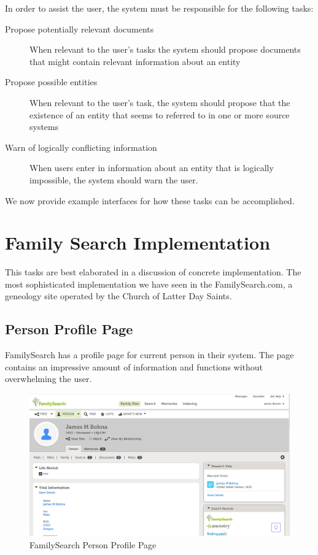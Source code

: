 \documentclass[format=siggraph, review=true]{acmart}
\begin{document}
In order to assist the user, the system must be responsible for the
following tasks:

\begin{description}
\item[Propose potentially relevant documents] When relevant to the
  user's tasks the system should propose documents that might
  contain relevant information about an entity
\item[Propose possible entities] When relevant to the user's task, the
  system should propose that the existence of an entity that seems to
  referred to in one or more source systems
\item[Warn of logically conflicting information] When users enter in
  information about an entity that is logically impossible, the system
  should warn the user.
\end{description}

We now provide example interfaces for how these tasks can be
accomplished.

\section*{Family Search Implementation}
This tasks are best elaborated in a discussion of concrete
implementation. The most sophisticated implementation we have seen in
the FamilySearch.com, a geneology site operated by the Church of
Latter Day Saints. 

\subsection*{Person Profile Page}
FamilySearch has a profile page for current person in their
system. The page contains an impressive amount of information and
functions without overwhelming the user.

\begin{figure}[h]

\includegraphics[width=\columnwidth]{images/familysearch/person-detail-1.png}

\caption{FamilySearch Person Profile Page}
\end{figure}
\end{document}
